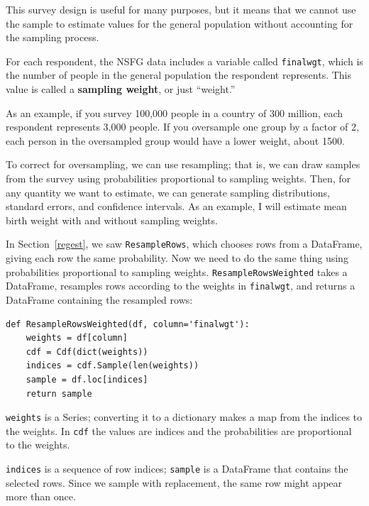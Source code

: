 \documentclass[12pt]{book}
\begin{document}
This survey design is useful for many purposes, but it means that we
cannot use the sample to estimate values for the general
population without accounting for the sampling process.

For each respondent, the NSFG data includes a variable called \verb"finalwgt",
which is the number of people in the general population the respondent
represents.  This value is called a {\bf sampling weight}, or just ``weight.''

As an example, if you survey 100,000 people in a country of 300
million, each respondent represents 3,000 people.  If you oversample
one group by a factor of 2, each person in the oversampled
group would have a lower weight, about 1500.

To correct for oversampling, we can use resampling; that is, we
can draw samples from the survey using probabilities proportional
to sampling weights.  Then, for any quantity we want to estimate, we can
generate sampling distributions, standard errors, and confidence
intervals.  As an example, I will estimate mean birth weight with
and without sampling weights.

In Section~\ref{regest}, we saw \verb"ResampleRows", which chooses
rows from a DataFrame, giving each row the same probability.
Now we need to do the same thing using probabilities
proportional to sampling weights.
\verb"ResampleRowsWeighted" takes a DataFrame, resamples rows according
to the weights in \verb"finalwgt", and returns a DataFrame containing
the resampled rows:

\begin{verbatim}
def ResampleRowsWeighted(df, column='finalwgt'):
    weights = df[column]
    cdf = Cdf(dict(weights))
    indices = cdf.Sample(len(weights))
    sample = df.loc[indices]
    return sample
\end{verbatim}

\verb"weights" is a Series; converting it to a dictionary makes
a map from the indices to the weights.  In \verb"cdf" the values
are indices and the probabilities are proportional to the
weights.

\verb"indices" is a sequence of row indices; \verb"sample" is a
DataFrame that contains the selected rows.  Since we sample with
replacement, the same row might appear more than once.  
\end{document}
